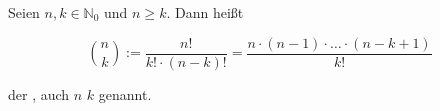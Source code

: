 Seien $n, k \in \mathbb{N}_0$ und $n \geq k$. Dann heißt

$$
\binom{n}{k} := \frac{n!}{k! \cdot (n-k)!} 
= \frac{n \cdot (n-1) \cdot \ldots \cdot (n-k+1)}{k!}
$$

der , auch $n$  $k$ genannt.